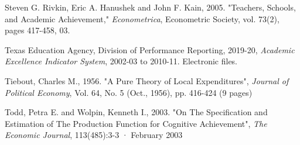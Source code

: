 \documentclass[11pt]{article}
\begin{document}
\begin{thebibliography}{9}
Steven G. Rivkin, Eric A. Hanushek and John F. Kain, 2005. 
"Teachers, Schools, and Academic Achievement," 
\textit{Econometrica}, Econometric Society, vol. 73(2), pages 417-458, 03.


Texas Education Agency, Division of Performance Reporting, 2019-20,
\textit{Academic Excellence Indicator System}, 2002-03 to 2010-11. Electronic files.


Tiebout, Charles M., 1956.
"A Pure Theory of Local Expenditures",
\textit{Journal of Political Economy}, Vol. 64, No. 5 (Oct., 1956), pp. 416-424 (9 pages)




Todd, Petra E. and Wolpin, Kenneth I., 2003.
"On The Specification and Estimation of The Production Function for Cognitive Achievement",
\textit{The Economic Journal}, 113(485):3-3 · February 2003








\end{thebibliography}
\end{document}
